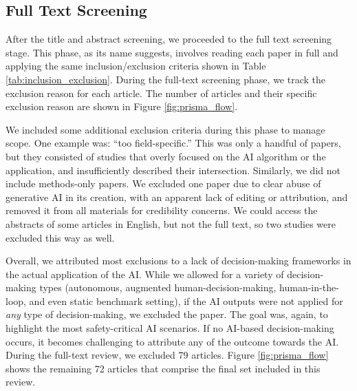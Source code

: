 \documentclass[authoryear,preprint,12pt]{elsarticle}
\begin{document}
\begin{table}[h]
\renewcommand{\arraystretch}{1.5}
\caption{Inclusion and exclusion criteria used for abstract screening phase.}

\label{tab:inclusion_exclusion}
\end{table}

\FloatBarrier

\subsection{Full Text Screening}
After the title and abstract screening, we proceeded to the full text screening
stage. This phase, as its name suggests, involves reading each paper in full and
applying the same inclusion/exclusion criteria shown in Table
\ref{tab:inclusion_exclusion}. During the full-text screening phase, we track
the exclusion reason for each article. The number of articles and their specific
exclusion reason are shown in Figure \ref{fig:prisma_flow}. 

We included some additional exclusion criteria during this phase to manage
scope. One example was: ``too field-specific.'' This was only a handful of
papers, but they consisted of studies that overly focused on the AI algorithm or
the application, and insufficiently described their intersection. Similarly, we
did not include methods-only papers. We excluded one paper due to clear abuse of
generative AI in its creation, with an apparent lack of editing or attribution,
and removed it from all materials for credibility concerns. We could access the
abstracts of some articles in English, but not the full text, so two studies
were excluded this way as well. 

Overall, we attributed most exclusions to a lack of decision-making frameworks
in the actual application of the AI. While we allowed for a variety of
decision-making types (autonomous, augmented human-decision-making,
human-in-the-loop, and even static benchmark setting), if the AI outputs were
not applied for \textit{any} type of decision-making, we excluded the paper. The
goal was, again, to highlight the most safety-critical AI scenarios. If no
AI-based decision-making occurs, it becomes challenging to attribute any of the
outcome towards the AI. During the full-text review, we excluded 79 articles.
Figure \ref{fig:prisma_flow} shows the remaining 72 articles that comprise the
final set included in this review. 
\end{document}
